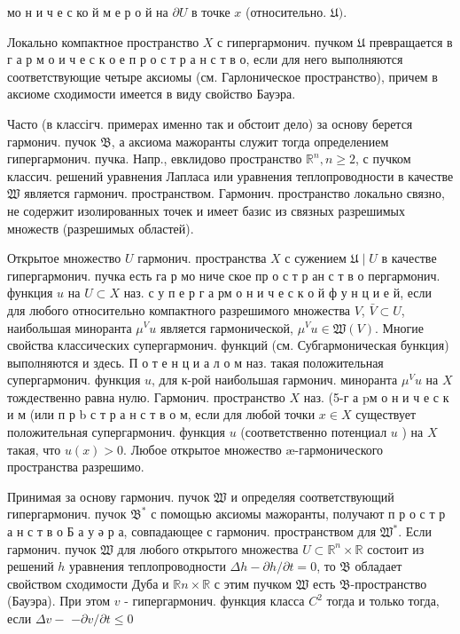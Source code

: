 \documentclass[10pt]{article}
\begin{document}
мо н и ч е с ко й м е р о й на $\partial U$ в точке $x$ (относительно. $\mathfrak{U})$.



Локально компактное пространство $X$ с гипергармонич. пучком $\mathfrak{U}$ превращается в г а р м о и ч е с к о е п р о с т р а н с т в о, если для него выполняются соответствующие четыре аксиомы (см. Гарлоническое пространство), причем в аксиоме сходимости имеется в виду свойство Бауэра.



Часто (в классігч. примерах именно так и обстоит дело) за основу берется гармонич. пучок $\mathfrak{B}$, а аксиома мажоранты служит тогда определением гипергармонич. пучка. Напр., евклидово пространство $\mathbb{R}^{n}, n \geqslant 2$, с пучком классич. решений уравнения Лапласа или уравнения теплопроводности в качестве $\mathfrak{W}$ является гармонич. пространством. Гармонич. пространство локально связно, не содержит изолированных точек и имеет базис из связных разрешимых множеств (разрешимых областей).



Открытое множество $U$ гармонич. пространства $X$ с сужением $\mathfrak{U} \mid U$ в качестве гипергармонич. пучка есть га р мо ниче ское пр о с т р ан с т в о пергармонич. функция $u$ на $U \subset X$ наз. с у п е р г а рм о н и ч е с к о й ф у н ц и е й, если для любого относительно компактного разрешимого множества $V$, $\bar{V} \subset U$, наибольшая миноранта $\mu^{V} u$ является гармонической, $\mu^{V} u \in \mathfrak{W}(V)$. Многие свойства классических супергармонич. функций (см. Субгармоническая бункция) выполняются и здесь. П о т е н ц и а л о м наз. такая положительная супергармонич. функция $u$, для к-рой наибольшая гармонич. миноранта $\mu^{V} u$ на $X$ тождественно равна нулю. Гармонич. пространство $X$ наз. (5-г а pм о н и ч е с к и м (или п р b с т р а н с т в о м, если для любой точки $x \in X$ существует положительная супергармонич. функция $u$ (соответственно потенциал $u$ ) на $X$ такая, что $u(x)>0$. Любое открытое множество æ-гармонического пространства разрешимо.



Принимая за основу гармонич. пучок $\mathfrak{W}$ и определяя соответствующий гипергармонич. пучок $\mathfrak{B}^{*}$ с помощью аксиомы мажоранты, получают п р о с т р а н с т в о Б а у ә р а, совпадающее с гармонич. пространством для $\mathfrak{W}^{*}$. Если гармонич. пучок $\mathfrak{W}$ для любого открытого множества $U \subset \mathbb{R}^{n} \times \mathbb{R}$ состоит из решений $h$ уравнения теплопроводности $\Delta h-\partial h / \partial t=0$, то $\mathfrak{B}$ обладает свойством сходимости Дуба и $\mathbb{R} n \times \mathbb{R}$ с этим пучком $\mathfrak{W}$ есть $\mathfrak{B}$-пространство (Бауэра). При этом $v$ - гипергармонич. функция класса $C^{2}$ тогда и только тогда, если $\Delta v-$ $-\partial v / \partial t \leqslant 0$
\end{document}
